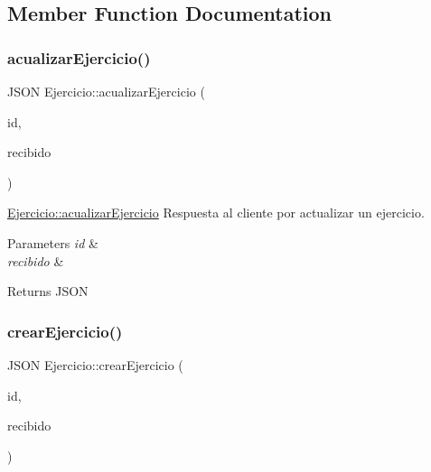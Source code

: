 \subsection{Member Function Documentation}
\mbox{\label{classEjercicio_a26572720af03b741e5e13a3a1a5b4dcc}} 
\subsubsection{\texorpdfstring{acualizar\+Ejercicio()}{acualizarEjercicio()}}
{\footnotesize\ttfamily J\+S\+ON Ejercicio\+::acualizar\+Ejercicio (\begin{DoxyParamCaption}\item[{int}]{id,  }\item[{J\+S\+ON}]{recibido }\end{DoxyParamCaption})}



\mbox{\hyperlink{classEjercicio_a26572720af03b741e5e13a3a1a5b4dcc}{Ejercicio\+::acualizar\+Ejercicio}} Respuesta al cliente por actualizar un ejercicio. 


\begin{DoxyParams}{Parameters}
{\em id} & \\
\hline
{\em recibido} & \\
\hline
\end{DoxyParams}
\begin{DoxyReturn}{Returns}
J\+S\+ON 
\end{DoxyReturn}
\mbox{\label{classEjercicio_a84f913ec55c51739867e7365b69684cb}} 
\subsubsection{\texorpdfstring{crear\+Ejercicio()}{crearEjercicio()}}
{\footnotesize\ttfamily J\+S\+ON Ejercicio\+::crear\+Ejercicio (\begin{DoxyParamCaption}\item[{int}]{id,  }\item[{J\+S\+ON}]{recibido }\end{DoxyParamCaption})}



